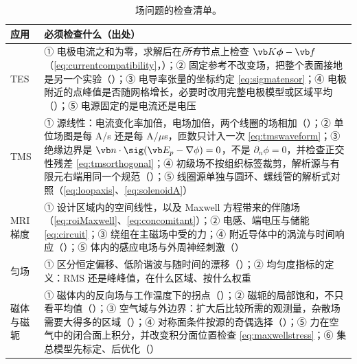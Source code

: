 \begin{table}[htbp]\centering\small
\caption{场问题的检查清单。}\label{tab:practice-check-fields}
\begin{tabularx}{\linewidth}{@{}>{\raggedright\arraybackslash}p{.13\linewidth} Y@{}}
\toprule
应用 & 必须检查什么（出处）\\\midrule
TES & ① 电极电流之和为零，求解后在\emph{所有}节点上检查 $\vb K\boldsymbol\phi-\vb f$（\eqref{eq:currentcompatibility}，）；② 固定参考不改变场，把整个表面接地是另一个实验（）；③ 电导率张量的坐标约定 \eqref{eq:sigmatensor}；④ 电极附近的点峰值是否随网格增长，必要时改用完整电极模型或区域平均（）；⑤ 电源固定的是电流还是电压\\
TMS & ① 源线性：电流变化率加倍，电场加倍，两个线圈的场相加（）；② 单位场图是每 A/s 还是每 A/$\mu$s，匝数只计入一次 \eqref{eq:tmswaveform}；③ 绝缘边界是 $\vb n\cdot\sig(\vb E_p-\nabla\phi)=0$，不是 $\partial_n\phi=0$，并检查正交性残差 \eqref{eq:tmsorthogonal}；④ 初级场不按组织标签裁剪，解析源与有限元右端用同一个规范（）；⑤ 线圈源单独与圆环、螺线管的解析式对照（\eqref{eq:loopaxis}、\eqref{eq:solenoidA}）\\
MRI 梯度 & ① 设计区域内的空间线性，以及 Maxwell 方程带来的伴随场（\eqref{eq:roiMaxwell}、\eqref{eq:concomitant}）；② 电感、端电压与储能 \eqref{eq:circuit}；③ 绕组在主磁场中受的力；④ 附近导体中的涡流与时间响应（）；⑤ 体内的感应电场与外周神经刺激（）\\
匀场 & ① 区分恒定偏移、低阶谐波与随时间的漂移（）；② 均匀度指标的定义：RMS 还是峰峰值，在什么区域、按什么权重\\
磁体与磁轭 & ① 磁体内的反向场与工作温度下的拐点（）；② 磁轭的局部饱和，不只看平均值（）；③ 空气域与外边界：扩大后比较所需的观测量，杂散场需要大得多的区域（）；④ 对称面条件按源的奇偶选择（）；⑤ 力在空气中的闭合面上积分，并改变积分面位置检查 \eqref{eq:maxwellstress}；⑥ 集总模型先标定、后优化（）\\
\bottomrule
\end{tabularx}
\end{table}


